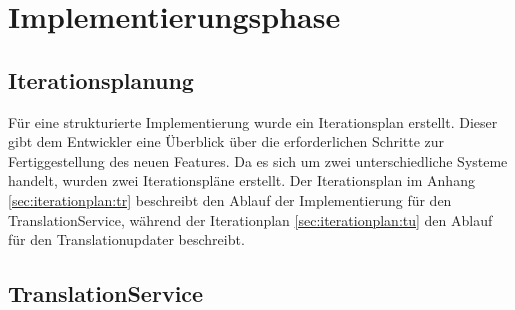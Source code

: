 \documentclass[10pt, oneside, ngerman]{article}
\begin{document}
  \section{Implementierungsphase}
  \subsection{Iterationsplanung}
      Für eine strukturierte Implementierung wurde ein Iterationsplan erstellt. Dieser gibt dem Entwickler eine Überblick über die erforderlichen Schritte
      zur Fertiggestellung des neuen Features. Da es sich um zwei unterschiedliche Systeme handelt, wurden zwei Iterationspläne erstellt. Der Iterationsplan im Anhang \ref{sec:iterationplan:tr} beschreibt
      den Ablauf der Implementierung für den TranslationService, während der Iterationplan \ref{sec:iterationplan:tu} den Ablauf für den Translationupdater beschreibt.
  \subsection{TranslationService}\label{sec:impl:ts}
\end{document}
